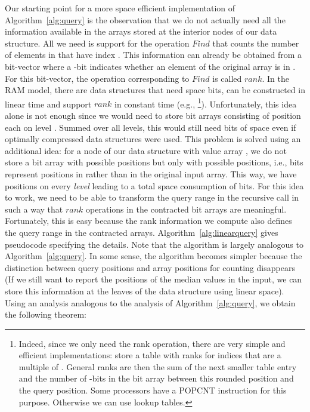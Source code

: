 \documentclass[a4paper,10pt]{article}
\newcommand{\Id}[1]{\ensuremath{\mathit{#1}}}
\begin{document}
Our starting point for a more space efficient implementation of
Algorithm~\ref{alg:query} is the observation that we do not actually
need all the information available in the arrays stored at the
interior nodes of our data structure. All we need is support for the
operation \Id{Find} that counts the number of elements  in
 that have index .  This information can already be
obtained from a bit-vector where a -bit indicates whether an
element of the original array  is in . For this bit-vector, the operation
corresponding to \Id{Find} is called \Id{rank}.  In the RAM model, there are data
structures that need space  bits,  can be constructed in
linear time and support \Id{rank} in constant time (e.g.,
\cite{Cla88,OkaSad06}\footnote{Indeed, since we only need the rank operation, there are very simple and efficient implementations: store a table with ranks for
indices that are a multiple of . General ranks are then the sum of the next smaller table entry and the number of -bits in the bit array between this rounded position and
the query position. Some processors have a POPCNT instruction for this purpose. Otherwise we can use lookup tables.}).  Unfortunately, this idea alone is not enough
since we would need to store  bit arrays consisting of 
position each on level .  Summed over all levels, this would still
need  bits of space even if optimally compressed data
structures were used.  This problem is solved using an additional
idea: for a node  of our data structure  with value array , we do not store a bit
array with  possible positions but only with  possible
positions, i.e., bits represent positions in  rather than in the
original input array. This way, we have  positions on every
\emph{level} leading to a total space consumption of  
bits.  For this idea to work, we need to be able to transform the
query range in the recursive call in such a way that \Id{rank}
operations in the contracted bit arrays are meaningful. Fortunately,
this is easy because the rank information we compute also defines the
query range in the contracted arrays. Algorithm~\ref{alg:linearquery}
gives pseudocode specifying the details.  Note that the algorithm is
largely analogous to Algorithm~\ref{alg:query}.  In some sense, the
algorithm becomes simpler because the distinction between query
positions and array positions for counting disappears (If we still
want to report the positions of the median values in the input, we can
store this information at the leaves of the data structure using
linear space). Using an analysis analogous to the analysis of
Algorithm~\ref{alg:query}, we obtain the following theorem:
\end{document}
